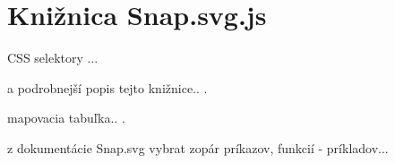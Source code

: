 \chapter{Knižnica Snap.svg.js}

CSS selektory ... 

a podrobnejší popis tejto knižnice.. .

mapovacia tabuľka.. .

z dokumentácie Snap.svg vybrat zopár príkazov, funkcií - príkladov...

